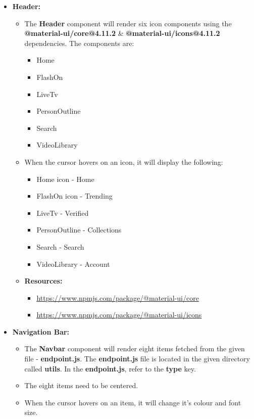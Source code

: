 \documentclass{article}
\begin{document}
\begin{itemize}
	\item \textbf{Header:}
	\begin{itemize}
		\item The \textbf{Header} component will render six icon components using the \textbf{@material-ui/core@4.11.2} \& \textbf{@material-ui/icons@4.11.2} dependencies. The components are:
		\begin{itemize}
			\item Home
			\item FlashOn
			\item LiveTv
			\item PersonOutline
			\item Search
			\item VideoLibrary
		\end{itemize} 
		\item When the cursor hovers on an icon, it will display the following:
		\begin{itemize}
			\item Home icon - Home
			\item FlashOn icon - Trending
			\item LiveTv - Verified
			\item PersonOutline - Collections
			\item Search - Search
			\item VideoLibrary - Account
		\end{itemize}
		\item \textbf{Resources:} 
		\begin{itemize}
			\item \href{https://www.npmjs.com/package/@material-ui/core}{https://www.npmjs.com/package/@material-ui/core}
			\item \href{https://www.npmjs.com/package/@material-ui/icons}{https://www.npmjs.com/package/@material-ui/icons}
		\end{itemize}
	\end{itemize}
	\item \textbf{Navigation Bar:}
	\begin{itemize}
		\item The \textbf{Navbar} component will render eight items fetched from the given file - \textbf{endpoint.js}. The \textbf{endpoint.js} file is located in the given directory called \textbf{utils}. In the \textbf{endpoint.js}, refer to the \textbf{type} key.
		\item The eight items need to be centered.
		\item When the cursor hovers on an item, it will change it's colour and font size.

\end{itemize}
\end{itemize}
\end{document}
